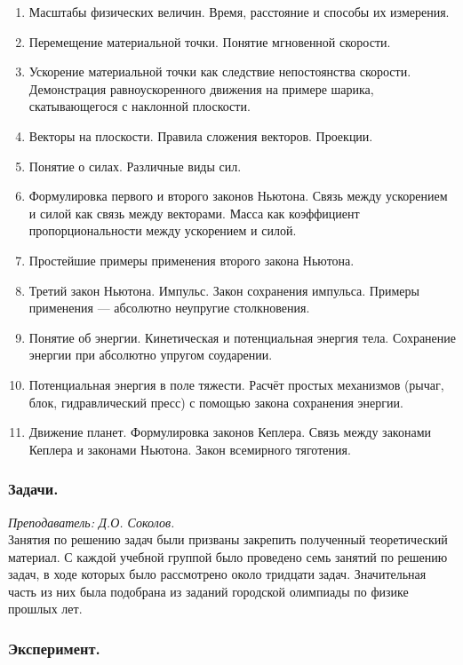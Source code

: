 \documentclass[12pt]{article}
\newlength{\h}
\newlength{\x}
\begin{document}
\begin{enumerate}
\item Масштабы физических величин. Время, расстояние и способы их
  измерения. 
\item Перемещение материальной точки. Понятие мгновенной скорости.
\item Ускорение материальной точки как следствие непостоянства
  скорости. Демонстрация равноускоренного движения на примере
  шарика, скатывающегося с наклонной плоскости.
\item Векторы на плоскости. Правила сложения векторов. Проекции.
\item Понятие о силах. Различные виды сил.
\item Формулировка первого и второго законов Ньютона. Связь между
  ускорением и силой как связь между векторами. Масса как коэффициент
  пропорциональности между ускорением и силой. 
\item Простейшие примеры применения второго закона Ньютона.
\item Третий закон Ньютона. Импульс. Закон сохранения
  импульса. Примеры применения --- абсолютно неупругие столкновения.
\item Понятие об энергии. Кинетическая и потенциальная энергия
  тела. Сохранение энергии при абсолютно упругом соударении.
\item Потенциальная энергия в поле тяжести. Расчёт простых механизмов
  (рычаг, блок, гидравлический пресс) с помощью закона сохранения
  энергии.
\item Движение планет. Формулировка законов Кеплера. Связь между
  законами Кеплера и законами Ньютона. Закон всемирного тяготения. 
\end{enumerate}

\subsubsection{Задачи.}
\label{sec:daily8pr}

\textit{Преподаватель: Д.О. Соколов. }\\

Занятия по решению задач были призваны закрепить полученный
теоретический материал. С каждой учебной группой было проведено семь
занятий по решению задач, в ходе которых было рассмотрено около
тридцати задач. Значительная часть из них была подобрана из заданий
городской олимпиады по физике прошлых лет. 

\subsubsection{Эксперимент.}
\label{sec:daily8exp}
\end{document}
